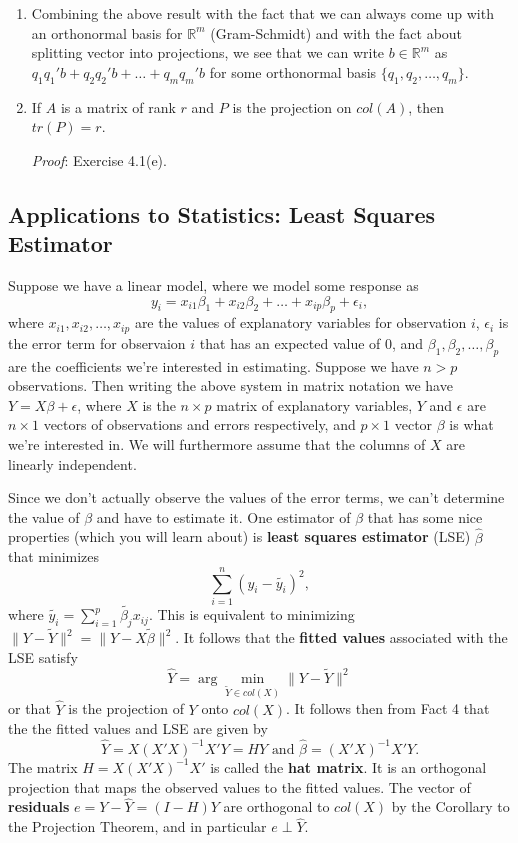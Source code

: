 \documentclass[12pt,oneside]{article}
\begin{document}
\begin{enumerate}
\item Combining the above result with the fact that we can always come
  up with an orthonormal basis for ${\mathbb{R}}^m$ (Gram-Schmidt) and
  with the fact about splitting vector into projections, we see that
  we can write $b \in {\mathbb{R}}^m$ as $q_1 q_1' b + q_2  q_2' b +
  \ldots + q_m q_m' b$ for some orthonormal basis $\{q_1, q_2, \ldots,
  q_m\}$.

\item If $A$ is a matrix of rank $r$ and $P$ is the projection on $col(A)$, then $tr(P) = r$.

\emph{Proof}: Exercise 4.1(e).

\end{enumerate}

\subsection{Applications to Statistics: Least Squares Estimator}
 Suppose we have a linear model, where we model some response as 
 $$y_i = x_{i1} \beta_1 + x_{i2} \beta_2 + \ldots + x_{ip} \beta_p + \epsilon_i,$$ 
 where $x_{i1}, x_{i2}, \ldots, x_{ip}$ are the values of explanatory variables for observation $i$, $\epsilon_i$ is the error term for observaion $i$ that has an expected value of 0, and $\beta_1, \beta_2, \ldots, \beta_p$ are the coefficients we're interested in estimating. Suppose we have $n > p$ observations. Then writing the above system in matrix notation we have $Y  = X \beta +
 \epsilon$, where $X$ is the $n \times p$ matrix of explanatory variables, $Y$ and $\epsilon$ are $n \times 1$ vectors of observations and errors respectively, and $p \times 1$ vector $\beta$ is what we're interested in. We will furthermore assume that the columns of $X$ are linearly independent.

Since we don't actually observe the values of the error terms, we can't determine the value of $\beta$ and have to estimate it. One estimator of $\beta$ that has some nice properties (which you will learn about)  is \textbf{least squares estimator} (LSE) $\hat{\beta}$ that minimizes 
\[\displaystyle\sum_{i=1}^n {(y_i - \tilde{y_i} )^2},\]
 where $\tilde{y_i}=\displaystyle\sum_{i=1}^p \tilde{\beta_j}x_{ij}$. This is equivalent to minimizing \( \| Y-\tilde{Y}\|^2=\|Y-X\tilde{\beta}\|^2\). It follows that the \textbf{fitted values} associated with the LSE satisfy 
\[ \hat{Y}=\arg\min\limits_{\tilde{Y}\in col(X)} \|Y-\tilde{Y}\|^2\]
or that \(\hat{Y} \) is the projection of \(Y\) onto \(col(X)\). It follows then from Fact 4 that the the fitted values and LSE are given by 
\[ \hat{Y}=X(X'X)^{-1}X'Y=HY \text{    and    } \hat{\beta}=(X'X)^{-1}X'Y.\]
The matrix $H = X(X'X)^{-1}X'$ is called the \textbf{hat matrix}. It is an orthogonal projection that maps the observed values to the fitted values. The vector of  \textbf{residuals} \(e = Y - \hat{Y} = (I - H) Y\) are orthogonal to \(col(X)\) by the Corollary to the Projection Theorem, and in particular \(e \perp \hat{Y}\). 
\end{document}
